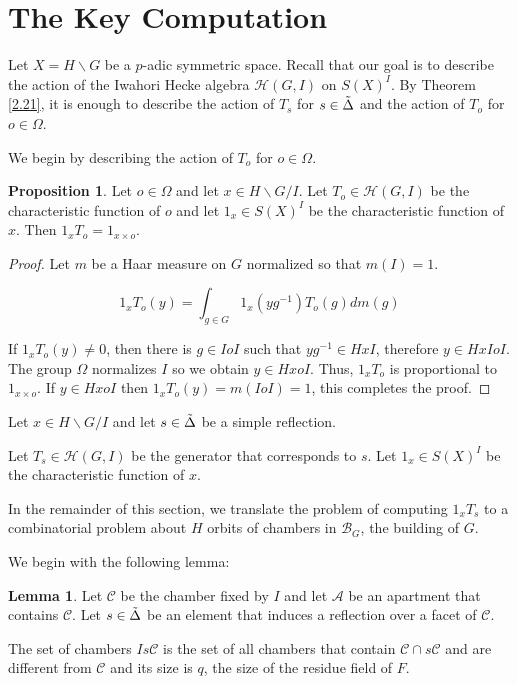 \documentclass[12pt]{article}
\newcommand{\A}{\mathcal{A}}
\newcommand{\B}{\mathcal{B}}
\newcommand{\C}{\mathcal{C}}
\newcommand{\<}{\langle}
\renewcommand{\>}{\rangle}
\theoremstyle{plain}
\theoremstyle{definition}
\newtheorem{prop}[theorem]{Proposition}
\newtheorem{lemma}[theorem]{Lemma}
\begin{document}
\section{The Key Computation}

Let $X=H\backslash G$ be a $p$-adic symmetric space. Recall that our goal is to describe the action of the Iwahori Hecke algebra $\mathcal{H}(G,I)$ on $S(X)^I$. By Theorem \ref{2.21}, it is enough to describe the action of $T_s$ for $s\in\Tilde{\Delta}$ and the action of $T_o$ for $o\in\Omega$.

We begin by describing the action of $T_o$ for $o\in\Omega$.

\begin{prop}\label{action of fund group}
    Let $o\in\Omega$ and let $x\in H\backslash G/I$. Let $T_o\in \mathcal{H}(G,I)$ be the characteristic function of $o$ and let $1_x\in S(X)^I$ be the characteristic function of $x$. Then $1_xT_o=1_{x\times o}$.
\end{prop}

\begin{proof}
    Let $m$ be a Haar measure on $G$ normalized so that $m(I)=1$.

    $$1_xT_o(y)=\int_{g\in G}1_x(yg^{-1})T_o(g)dm(g)$$

    If $1_xT_o(y)\neq 0$, then there is $g\in IoI$ such that $yg^{-1}\in HxI$, therefore $y\in HxIoI$. The group $\Omega$ normalizes $I$ so we obtain $y\in HxoI$. Thus, $1_xT_o$ is proportional to $1_{x\times o}$. If $y\in HxoI$ then $1_xT_o(y)=m(IoI)=1$, this completes the proof.
\end{proof}

Let $x\in  H\backslash G/I$ and let $s\in \Tilde{\Delta}$ be a simple reflection.

Let $T_s\in \mathcal{H}(G,I)$ be the generator that corresponds to $s$. Let $1_x\in S(X)^I$ be the characteristic function of $x$. 

In the remainder of this section, we translate the problem of computing $1_xT_s$ to a combinatorial problem about $H$ orbits of chambers in $\B_G$, the building of $G$.

We begin with the following lemma:
\begin{lemma}\label{3.13}
Let $\C$ be the chamber fixed by $I$ and let $\A$ be an apartment that contains $\C$. Let $s\in \Tilde{\Delta}$ be an element that induces a reflection over a facet of $\C$. 

The set of chambers $Is\C$ is the set of all chambers that contain $\C\cap s\C$ and are different from $\C$ and its size is $q$, the size of the residue field of $F$.  
\end{lemma}
\end{document}

